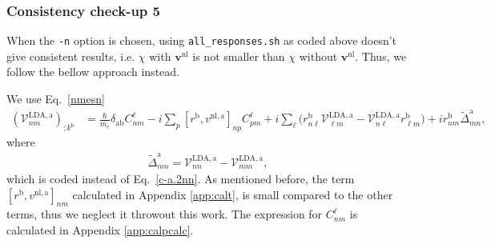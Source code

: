\subsubsection{Consistency check-up 5}\label{ccu5}

When the \verb=-n= option is chosen, using \verb=all_responses.sh= as
coded above doesn't give consistent results, i.e. $\chi$
 with $\mathbf{v}^\mathrm{nl}$  
is not smaller than $\chi$ 
 without $\mathbf{v}^\mathrm{nl}$. Thus, we follow the bellow approach instead.

We use Eq.~\eqref{nmesn}
\begin{align}\label{nmesnn}
(\mathcal{V}^{\mathrm{LDA},\mathrm{a}}_{nm})_{;k^{\mathrm{b}}}&=
\frac{\hbar}{m_e}\delta_{\mathrm{a}\mathrm{b}}
C^\ell_{nm} 
-i 
\sum_p 
[r^{\mathrm{b}},v^{\mathrm{nl},\mathrm{a}}]_{np}C^\ell_{pm} 
+i 
\sum_{\ell}
\bigg(
r^{\mathrm{b}}_{n\ell}  
\mathcal{V}^{\mathrm{LDA},\mathrm{a}}_{\ell m}
-
\mathcal{V}^{\mathrm{LDA},\mathrm{a}}_{n\ell}   
r^{\mathrm{b}}_{\ell m}
\bigg)  
+i  
r^{\mathrm{b}}_{nm}
\tilde\Delta^{\mathrm{a}}_{mn}
,
\end{align}  
where 
\begin{eqnarray}\label{tdeln}
\tilde\Delta^{\mathrm{a}}_{mn}
=
\mathcal{V}^{\mathrm{LDA},\mathrm{a}}_{nn}  
-
\mathcal{V}^{\mathrm{LDA},\mathrm{a}}_{mm}  
, 
\end{eqnarray}
which is coded instead of Eq.~\eqref{c-a.2nn}. 
 As mentioned before, the term $[r^{\mathrm{b}},v^{\mathrm{nl},\mathrm{a}}]_{nm}$
calculated in Appendix \ref{app:calt}, is small 
compared to the other terms, thus we neglect it throwout this work.\cite{valerie} 
The expression for $C^\ell_{nm}$ is calculated in Appendix \ref{app:calpcalc}.

